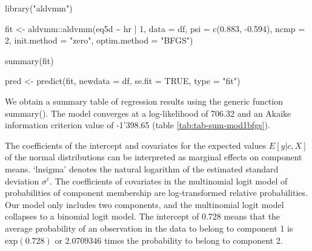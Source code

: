 \documentclass[
]{article}
\newenvironment{Shaded}{\begin{snugshade}}{\end{snugshade}}
\newcommand{\AttributeTok}[1]{\textcolor[rgb]{0.77,0.63,0.00}{#1}}
\newcommand{\ConstantTok}[1]{\textcolor[rgb]{0.00,0.00,0.00}{#1}}
\newcommand{\DecValTok}[1]{\textcolor[rgb]{0.00,0.00,0.81}{#1}}
\newcommand{\FloatTok}[1]{\textcolor[rgb]{0.00,0.00,0.81}{#1}}
\newcommand{\FunctionTok}[1]{\textcolor[rgb]{0.00,0.00,0.00}{#1}}
\newcommand{\NormalTok}[1]{#1}
\newcommand{\OtherTok}[1]{\textcolor[rgb]{0.56,0.35,0.01}{#1}}
\newcommand{\SpecialCharTok}[1]{\textcolor[rgb]{0.00,0.00,0.00}{#1}}
\newcommand{\StringTok}[1]{\textcolor[rgb]{0.31,0.60,0.02}{#1}}
\begin{document}
\begin{Shaded}
\begin{Highlighting}[]
\FunctionTok{library}\NormalTok{(}\StringTok{"aldvmm"}\NormalTok{)}

\NormalTok{fit }\OtherTok{\textless{}{-}}\NormalTok{ aldvmm}\SpecialCharTok{::}\FunctionTok{aldvmm}\NormalTok{(eq5d }\SpecialCharTok{\textasciitilde{}}\NormalTok{ hr }\SpecialCharTok{|} \DecValTok{1}\NormalTok{,}
                      \AttributeTok{data =}\NormalTok{ df,}
                      \AttributeTok{psi =} \FunctionTok{c}\NormalTok{(}\FloatTok{0.883}\NormalTok{, }\SpecialCharTok{{-}}\FloatTok{0.594}\NormalTok{),}
                      \AttributeTok{ncmp =} \DecValTok{2}\NormalTok{,}
                      \AttributeTok{init.method =} \StringTok{"zero"}\NormalTok{,}
                      \AttributeTok{optim.method =} \StringTok{"BFGS"}\NormalTok{)}

\FunctionTok{summary}\NormalTok{(fit)}

\NormalTok{pred }\OtherTok{\textless{}{-}} \FunctionTok{predict}\NormalTok{(fit,}
                \AttributeTok{newdata =}\NormalTok{ df,}
                \AttributeTok{se.fit =} \ConstantTok{TRUE}\NormalTok{,}
                \AttributeTok{type =} \StringTok{"fit"}\NormalTok{)}
\end{Highlighting}
\end{Shaded}

We obtain a summary table of regression results using the generic function summary(). The model converges at a log-likelihood of 706.32 and an Akaike information criterion value of -1'398.65 (table \ref{tab:tab-sum-mod1bfgs}).

The coefficients of the intercept and covariates for the expected values \(E[y|c, X]\) of the normal distributions can be interpreted as marginal effects on component means. `lnsigma' denotes the natural logarithm of the estimated standard deviation \(\sigma^{c}\). The coefficients of covariates in the multinomial logit model of probabilities of component membership are log-transformed relative probabilities. Our model only includes two components, and the multinomial logit model collapses to a binomial logit model. The intercept of 0.728 means that the average probability of an observation in the data to belong to component 1 is \(\text{exp}(0.728)\) or 2.0709346 times the probability to belong to component 2.
\end{document}
